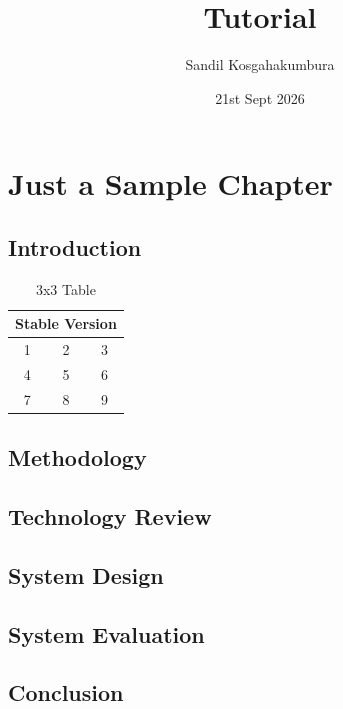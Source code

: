 \documentclass{report}
\title{Tutorial}
\author{Sandil Kosgahakumbura}
\date{21st Sept 2026}
\begin{document}
\maketitle
\tableofcontents
\listoffigures
\listoflistings

\chapter{Just a Sample Chapter}
\section{Introduction}
\lipsum[2]

\begin{table}
    \centering
    \begin{tabular}{ccc}

    \hline
    \multicolumn{3}{c}{Stable Version}\\
    \hline
        1 & 2 & 3\\
        4 & 5 & 6\\
        7 & 8 & 9\\
    \end{tabular}
    \caption{3x3 Table}
    \label{tab:exampletable}
\end{table}

\section{Methodology}
\lipsum[3]
\section{Technology Review}
\lipsum[3]
\section{System Design}
\lipsum[4]
\section{System Evaluation}
\lipsum[5]
\section{Conclusion}
\lipsum[6]
\end{document}

